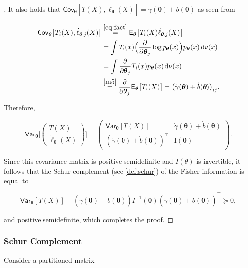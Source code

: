 \begin{proof}[]
It also holds that
\(\mathsf{Cov}_{\pmb{\theta}}[T(X), \dot{\ell}_{\pmb{\theta}}(X)] = \dot{\gamma}(\pmb{\theta}) + \dot{b}(\pmb{\theta})\)
as seen from

\[
	\begin{aligned} \mathsf{Cov}_{\boldsymbol{\theta}} \big[ T_{i}(X), \dot{\ell}_{\boldsymbol{\theta}, j}(X) \big] &\stackrel{\eqref{eq:fact} }{=} \mathsf{E}_{\boldsymbol{\theta}} \big[ T_{i}(X) \dot{\ell}_{\boldsymbol{\theta}, j}(X) \big] \\ &= \int T_{i}(x) \Big( \frac{\partial}{\partial \boldsymbol{\theta}_{j}} \log p_{\boldsymbol{\theta}}(x) \Big) p_{\boldsymbol{\theta}}(x) \, \mathrm{d}\nu(x) \\ &= \int \frac{\partial}{\partial \boldsymbol{\theta}_{j}} T_{i}(x) p_{\boldsymbol{\theta}}(x) \, \mathrm{d}\nu(x) \\ &\stackrel{\ref{m5}}{=} \frac{\partial}{\partial \boldsymbol{\theta}_{j}} \mathsf{E}_{\boldsymbol{\theta}} \big[ T_{i}(X) \big] = \big( \dot{\gamma}(\boldsymbol{\theta}) + \dot{b}(\boldsymbol{\theta}) \big)_{ij}. \end{aligned}
\]

Therefore,

\[\mathsf{Var}_{\boldsymbol{\theta}} \bigg[ \begin{pmatrix} T(X) \\ \dot{\ell}_{\boldsymbol{\theta}}(X) \end{pmatrix} \bigg] = \begin{pmatrix} \mathsf{Var}_{\boldsymbol{\theta}} [T(X)] & \dot{\gamma}(\boldsymbol{\theta}) + \dot{b}(\boldsymbol{\theta}) \\ \left( \dot{\gamma}(\boldsymbol{\theta}) + \dot{b}(\boldsymbol{\theta}) \right)^\top & \mathrm{I}(\boldsymbol{\theta}) \end{pmatrix}.\]

Since this covariance matrix is positive semidefinite and \(I(\theta)\)
is invertible, it follows that the Schur complement (see \autoref{def:schur})
of the Fisher information is equal to

\[
	\mathsf{Var}_{\boldsymbol{\theta}}[T(X)] - (\dot{\gamma}(\boldsymbol{\theta}) + \dot{b}(\boldsymbol{\theta}))I^{-1}(\boldsymbol{\theta})(\dot{\gamma}(\boldsymbol{\theta}) + \dot{b}(\boldsymbol{\theta}))^{\top} \succeq 0,
\]


and positive semidefinite, which completes the proof.
\end{proof}

\subsubsection*{Schur Complement}%
\label{ssub:schur}
Consider a partitioned matrix

